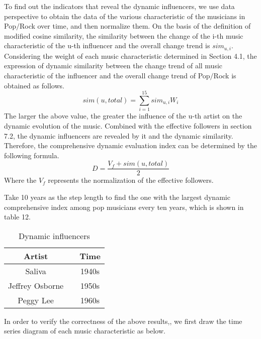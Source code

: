 \documentclass{mcmthesis}
\begin{document}
  To find out the indicators that reveal the dynamic influencers, we use data perspective to obtain the data of the various characteristic of the musicians in Pop$/$Rock over time, and then normalize them. On the basis of the definition of modified cosine similarity, the similarity between the change of the i-th music characteristic of the u-th influencer and the overall change trend is ${si{m_{u,i}}}$.
  Considering the weight of each music characteristic determined in Section 4.1, the expression of dynamic similarity between the change trend of all music characteristic of the influencer and the overall change trend of Pop$/$Rock is obtained as follows.
  \begin{equation}
  sim(u,total) = \sum\limits_{i = 1}^{15} {si{m_{u,i}}{W_i}} 
  \end{equation}
 The larger the above value, the greater the influence of the u-th artist on the dynamic evolution of the music. Combined with the effective followers in section 7.2, the dynamic influencers are revealed by  it and the dynamic similarity. Therefore, the comprehensive dynamic evaluation index can be determined by the following formula.
 \begin{equation}
D = \frac{{{V_f} + sim(u,total)}}{2}
 \end{equation}
Where the ${{V_f}}$ represents the normalization of the effective followers.

Take 10 years as the step length to find the one with the largest dynamic comprehensive index among pop musicians every ten years, which is shown in table 12.

\begin{table}[H]
	\centering  
	\caption{Dynamic influencers}
	
	\label{table_time}
	
	\begin{tabular}{ccc}  
		
		\toprule   
		
		Artist&\quad &Time \\ 
		\midrule    
		Saliva&\quad&1940s
		\\  
		Jeffrey Osborne&\quad&1950s
		\\ 
		Peggy Lee&\quad&1960s\\
		\bottomrule  
		
	\end{tabular}
\end{table}
In order to verify the correctness of the above results,, we first draw the time series diagram of each music characteristic as below.
\end{document}
